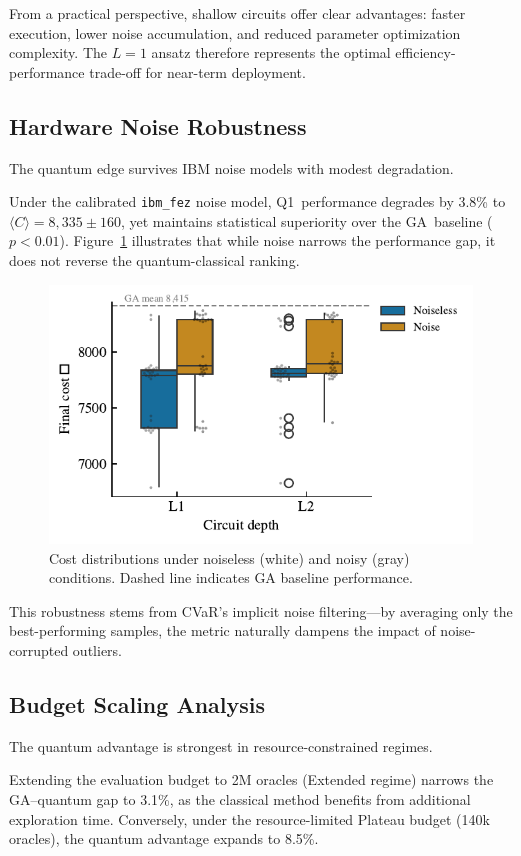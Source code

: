 From a practical perspective, shallow circuits offer clear advantages: faster 
execution, lower noise accumulation, and reduced parameter optimization complexity. 
The $L=1$ ansatz therefore represents the optimal efficiency-performance trade-off 
for near-term deployment.

\subsection{Hardware Noise Robustness}

The quantum edge survives IBM noise models with modest degradation.

Under the calibrated \texttt{ibm\_fez} noise model, Q1~performance degrades by 
3.8\% to $\langle C\rangle=8{,}335\pm160$, yet maintains statistical superiority 
over the GA~baseline ($p<0.01$). Figure~\ref{fig:noise} illustrates that while 
noise narrows the performance gap, it does not reverse the quantum-classical ranking.

\begin{figure}[h]
  \centering
  \includegraphics[width=.7\linewidth]{fig/noise_boxplot.pdf}
  \caption{Cost distributions under noiseless (white) and noisy (gray) conditions. 
           Dashed line indicates GA baseline performance.}
  \label{fig:noise}
\end{figure}

This robustness stems from CVaR's implicit noise filtering—by averaging only 
the best-performing samples, the metric naturally dampens the impact of 
noise-corrupted outliers.

\subsection{Budget Scaling Analysis}

The quantum advantage is strongest in resource-constrained regimes.

Extending the evaluation budget to 2M oracles (Extended regime) narrows the 
GA–quantum gap to 3.1\%, as the classical method benefits from additional 
exploration time. Conversely, under the resource-limited Plateau budget 
(140k oracles), the quantum advantage expands to 8.5\%.

